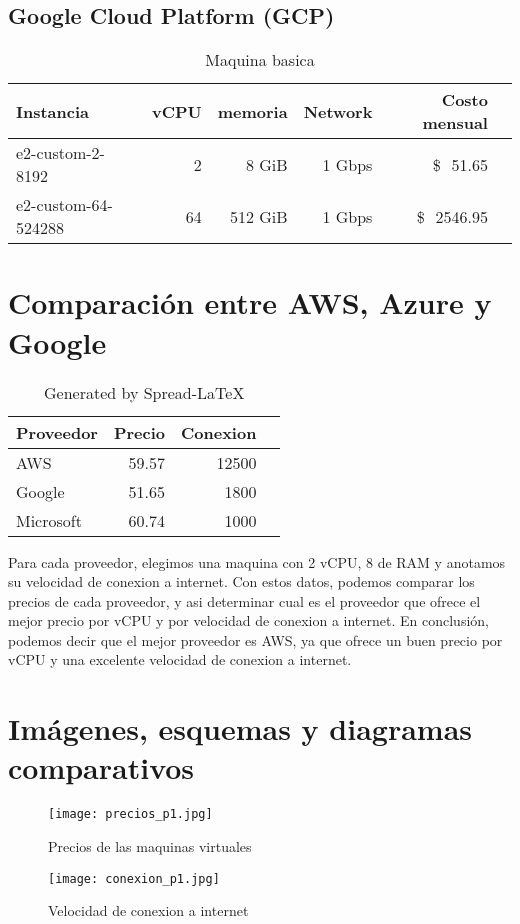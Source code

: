 \documentclass{article}
\newcommand{\usd}[1]{\SI{#1}[\$\ensuremath{\,}]{}}
\begin{document}
  \subsection{Google Cloud Platform (GCP)}


\begin{table}[!htp]\centering
\caption{Maquina basica}\label{tab:MV_google}
\scriptsize
\begin{tabular}{lrrrrr}\toprule
Instancia &vCPU &memoria &Network &Costo mensual\\\midrule
  e2-custom-2-8192 &2 &8 GiB &1 Gbps &\usd{51.65} \\
  e2-custom-64-524288 &64 &512 GiB &1 Gbps &\usd{2546.95} \\
\bottomrule
\end{tabular}
\end{table}


\section{Comparación entre AWS, Azure y Google}

\begin{table}[!htp]\centering
\caption{Generated by Spread-LaTeX}\label{tab: }
\scriptsize
\begin{tabular}{lrrr}\toprule
Proveedor &Precio &Conexion \\\midrule
AWS &59.57 &12500 \\
Google &51.65 &1800 \\
Microsoft &60.74 &1000 \\
\bottomrule
\end{tabular}
\end{table}

Para cada proveedor, elegimos una maquina con 2 vCPU, 8 de RAM y anotamos su velocidad de conexion a internet.
Con estos datos, podemos comparar los precios de cada proveedor, y asi determinar cual es el proveedor que ofrece el mejor precio por vCPU y por velocidad de conexion a internet.
En conclusión, podemos decir que el mejor proveedor es AWS, ya que ofrece un buen precio por vCPU y una excelente velocidad de conexion a internet.

\section{Imágenes, esquemas y diagramas comparativos}

\begin{figure}[!htp]
  \centering
  \texttt{[image: precios\_p1.jpg]}
  \caption{Precios de las maquinas virtuales}
  \label{fig:precios_p1}
\end{figure}
\begin{figure}[!htp]
  \centering
  \texttt{[image: conexion\_p1.jpg]}
  \caption{Velocidad de conexion a internet}
  \label{fig:conexion_p1}
\end{figure}

\printbibliography
\end{document}
